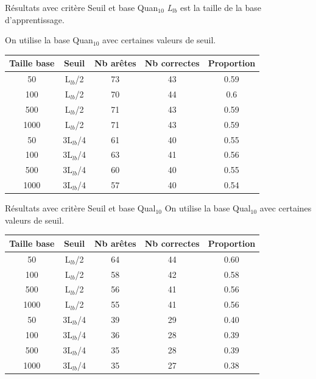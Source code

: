 \documentclass{beamer}
\begin{document}
\begin{frame}{Résultats avec critère Seuil et base Quan$_{10}$}
\emph{L$_{lb}$} est la taille de la base d'apprentissage. 


On utilise la base Quan$_{10}$ avec certaines valeurs de seuil.

\begin{tabular}{|c|c|c|c|c|}
   \hline
   Taille base & Seuil & Nb arêtes & Nb correctes & Proportion\\
   \hline
   50 & L$_{lb}$/2 & 73 & 43 & 0.59  \\   
   \hline
   100 & L$_{lb}$/2 & 70 & 44 & 0.6  \\
   \hline
   500 & L$_{lb}$/2 & 71 & 43 & 0.59  \\
   \hline
   1000 & L$_{lb}$/2 & 71 & 43 & 0.59  \\
   \hline
   \hline
   50 & 3L$_{lb}$/4 & 61 & 40 & 0.55  \\
   \hline
   100 & 3L$_{lb}$/4 & 63 & 41 & 0.56  \\
   \hline
   500 & 3L$_{lb}$/4 & 60 & 40 & 0.55  \\
   \hline
   1000 & 3L$_{lb}$/4 & 57 & 40 & 0.54  \\
   \hline
\end{tabular}


\end{frame}

\begin{frame}{Résultats avec critère Seuil et base Qual$_{10}$}
On utilise la base Qual$_{10}$ avec certaines valeurs de seuil.
\begin{tabular}{|c|c|c|c|c|}
   \hline
   Taille base & Seuil & Nb arêtes & Nb correctes & Proportion\\
    \hline
   50 & L$_{lb}$/2 & 64 & 44 & 0.60  \\
   \hline
   100 & L$_{lb}$/2 & 58 & 42 & 0.58  \\
   \hline
   500 & L$_{lb}$/2 & 56 & 41 & 0.56  \\
   \hline
   1000 & L$_{lb}$/2 & 55 & 41 & 0.56  \\
   \hline
   \hline
   50 & 3L$_{lb}$/4 & 39 & 29 & 0.40  \\
   \hline
   100 & 3L$_{lb}$/4 & 36 & 28 & 0.39  \\
   \hline
   500 & 3L$_{lb}$/4 & 35 & 28 & 0.39  \\
   \hline
   1000 & 3L$_{lb}$/4 & 35 & 27 & 0.38  \\
   \hline
\end{tabular}
\end{frame}
\end{document}
